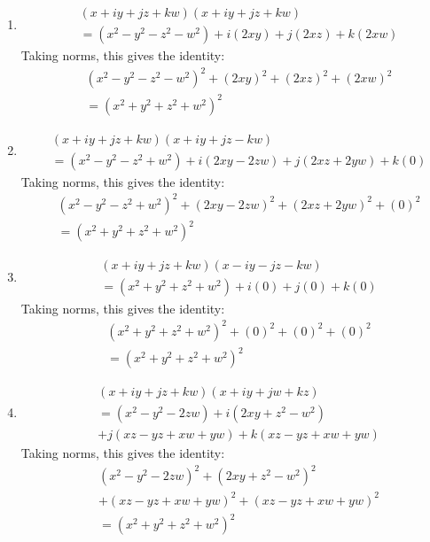 \documentclass[12pt]{article}
\theoremstyle{definition}
\numberwithin{equation}{section}
\begin{document}
\begin{enumerate}[{Identity} I:]
\item
    \begin{align*}
    &(x + iy + jz + kw)(x + iy + jz + kw) \\
    &= (x^2 - y^2 - z^2 - w^2 ) + i(2xy) + j(2xz) + k(2xw) 
    \end{align*}
Taking norms, this gives the identity:
    \begin{align*}
    &(x^2 - y^2 - z^2 - w^2 )^2 + (2xy)^2 + (2xz)^2 + (2xw)^2 \\
    &= (x^2 + y^2 + z^2 + w^2)^2
    \end{align*}
\item
    \begin{align*}
    &(x + iy + jz + kw)(x + iy + jz - kw) \\
    &= (x^2 - y^2 - z^2 + w^2 ) + i(2xy - 2zw) + j(2xz + 2yw) + k(0) 
    \end{align*}
Taking norms, this gives the identity:
    \begin{align*}
    &(x^2 - y^2 - z^2 + w^2 )^2 + (2xy - 2zw)^2 + (2xz + 2yw)^2 + (0)^2\\ 
    &= (x^2 + y^2 + z^2 + w^2)^2
    \end{align*}
\item
    \begin{align*}
    &(x + iy + jz + kw)(x - iy - jz - kw) \\
    &= (x^2 + y^2 + z^2 + w^2 ) + i(0) + j(0) + k(0) 
    \end{align*}
Taking norms, this gives the identity:
    \begin{align*}
    &(x^2 + y^2 + z^2 + w^2 )^2 + (0)^2 + (0)^2 + (0)^2 \\
    &= (x^2 + y^2 + z^2 + w^2)^2
    \end{align*}
\item
    \begin{align*}
    &(x + iy + jz + kw)(x + iy + jw + kz) \\
    &= (x^2 - y^2 - 2zw ) + i(2xy + z^2 -w^2) \\
        &+ j(xz - yz + xw + yw) + k(xz - yz + xw + yw) 
    \end{align*}
Taking norms, this gives the identity:
    \begin{align*}
    &(x^2 - y^2 - 2zw )^2 + (2xy + z^2 - w^2)^2 \\
        &+ (xz - yz + xw + yw)^2 + (xz - yz + xw + yw)^2 \\
    &= (x^2 + y^2 + z^2 + w^2)^2
    \end{align*}

\end{enumerate}
\end{document}
